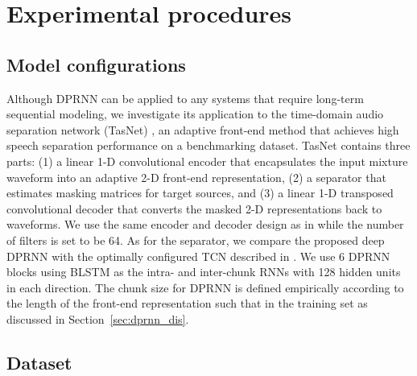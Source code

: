 \documentclass{article}
\begin{document}
 
\section{Experimental procedures}
\label{sec:exp}
\subsection{Model configurations}

Although DPRNN can be applied to any systems that require long-term sequential modeling, we investigate its application to the time-domain audio separation network (TasNet) \cite{luo2018tasnet, luo2018real, luo2019conv}, an adaptive front-end method that achieves high speech separation performance on a benchmarking dataset. TasNet contains three parts: (1) a linear 1-D convolutional encoder that encapsulates the input mixture waveform into an adaptive 2-D front-end representation, (2) a separator that estimates  masking matrices for  target sources, and (3) a linear 1-D transposed convolutional decoder that converts the masked 2-D representations back to waveforms. We use the same encoder and decoder design as in \cite{luo2019conv} while the number of filters is set to be 64. As for the separator, we compare the proposed deep DPRNN with the optimally configured TCN described in \cite{luo2019conv}. We use 6 DPRNN blocks using BLSTM \cite{hochreiter1997long} as the intra- and inter-chunk RNNs with 128 hidden units in each direction. The chunk size  for DPRNN is defined empirically according to the length of the front-end representation such that  in the training set as discussed in Section~\ref{sec:dprnn_dis}.

\subsection{Dataset}
\end{document}
